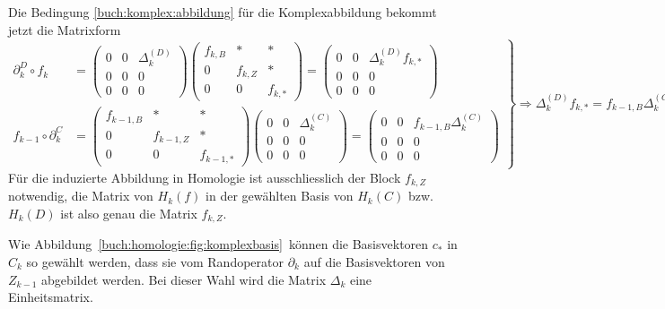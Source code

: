 Die Bedingung \eqref{buch:komplex:abbildung} für die Komplexabbildung
bekommt jetzt die Matrixform
\begin{equation}
\left.
\begin{aligned}
\partial_k^{D}\circ f_k
&=
\begin{pmatrix}
0&0&\Delta_k^{(D)}\\
0&0&0\\
0&0&0
\end{pmatrix}
\begin{pmatrix}
f_{k,B} &    *    & * \\
   0    & f_{k,Z} & * \\
   0    &    0    & f_{k,*}
\end{pmatrix}
=
\begin{pmatrix}
0&0&\Delta_k^{(D)}f_{k,*}\\
0&0&0\\
0&0&0
\end{pmatrix}
\\
f_{k-1}\circ \partial_k^C
&=
\begin{pmatrix}
f_{k-1,B}&   *   &   *   \\
   0   &f_{k-1,Z}&   *   \\
   0   &   0   &f_{k-1,*}
\end{pmatrix}
\begin{pmatrix}
0&0&\Delta_k^{(C)}\\
0&0&0\\
0&0&0
\end{pmatrix}
=
\begin{pmatrix}
0&0&f_{k-1,B}\Delta_k^{(C)}\\
0&0&0\\
0&0&0
\end{pmatrix}
\end{aligned}
\right\}
\Rightarrow
\Delta_k^{(D)}f_{k,*}
=
f_{k-1,B}\Delta_k^{(C)}.
\label{buch:homologie:matrixform}
\end{equation}
Für die induzierte Abbildung in Homologie ist ausschliesslich der
Block $f_{k,Z}$ notwendig, die Matrix von $H_k(f)$ in der gewählten
Basis von $H_k(C)$ bzw.~$H_k(D)$ ist also genau die Matrix $f_{k,Z}$.


Wie Abbildung~\ref{buch:homologie:fig:komplexbasis} können die
Basisvektoren $c_*$ in $C_k$ so gewählt werden, dass sie vom Randoperator
$\partial_k$ auf die Basisvektoren von $Z_{k-1}$ abgebildet werden.
Bei dieser Wahl wird die Matrix $\Delta_k$ eine Einheitsmatrix.

